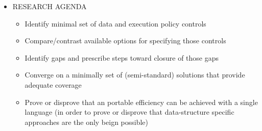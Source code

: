\begin{itemize}
\item RESEARCH AGENDA
  \begin{itemize}
  \item Identify minimal set of data and execution policy controls
  \item Compare/contrast available options for specifying those controls
  \item Identify gaps and prescribe steps toward closure of those gaps
  \item Converge on a minimally set of (semi-standard) solutions that provide adequate coverage
  \item Prove or disprove that an portable efficiency can be achieved with a single language (in order to prove or disprove that data-structure specific approaches are the only beign possible)
  \end{itemize}

\end{itemize}



